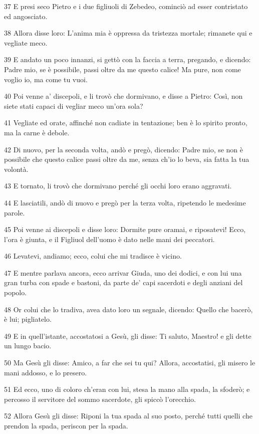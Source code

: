 \par 37 E presi seco Pietro e i due figliuoli di Zebedeo, cominciò ad esser contristato ed angosciato.
\par 38 Allora disse loro: L'anima mia è oppressa da tristezza mortale; rimanete qui e vegliate meco.
\par 39 E andato un poco innanzi, si gettò con la faccia a terra, pregando, e dicendo: Padre mio, se è possibile, passi oltre da me questo calice! Ma pure, non come voglio io, ma come tu vuoi.
\par 40 Poi venne a' discepoli, e li trovò che dormivano, e disse a Pietro: Così, non siete stati capaci di vegliar meco un'ora sola?
\par 41 Vegliate ed orate, affinché non cadiate in tentazione; ben è lo spirito pronto, ma la carne è debole.
\par 42 Di nuovo, per la seconda volta, andò e pregò, dicendo: Padre mio, se non è possibile che questo calice passi oltre da me, senza ch'io lo beva, sia fatta la tua volontà.
\par 43 E tornato, li trovò che dormivano perché gli occhi loro erano aggravati.
\par 44 E lasciatili, andò di nuovo e pregò per la terza volta, ripetendo le medesime parole.
\par 45 Poi venne ai discepoli e disse loro: Dormite pure oramai, e riposatevi! Ecco, l'ora è giunta, e il Figliuol dell'uomo è dato nelle mani dei peccatori.
\par 46 Levatevi, andiamo; ecco, colui che mi tradisce è vicino.
\par 47 E mentre parlava ancora, ecco arrivar Giuda, uno dei dodici, e con lui una gran turba con spade e bastoni, da parte de' capi sacerdoti e degli anziani del popolo.
\par 48 Or colui che lo tradiva, avea dato loro un segnale, dicendo: Quello che bacerò, è lui; pigliatelo.
\par 49 E in quell'istante, accostatosi a Gesù, gli disse: Ti saluto, Maestro! e gli dette un lungo bacio.
\par 50 Ma Gesù gli disse: Amico, a far che sei tu qui? Allora, accostatisi, gli misero le mani addosso, e lo presero.
\par 51 Ed ecco, uno di coloro ch'eran con lui, stesa la mano alla spada, la sfoderò; e percosso il servitore del sommo sacerdote, gli spiccò l'orecchio.
\par 52 Allora Gesù gli disse: Riponi la tua spada al suo posto, perché tutti quelli che prendon la spada, periscon per la spada.
